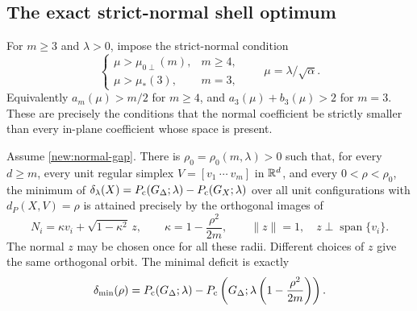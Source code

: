 \subsection{The exact strict-normal shell optimum}

For $m\ge3$ and $\lambda>0$, impose the strict-normal condition
\begin{equation}\label{new:normal-gap}
 \begin{cases}
  \mu>\mu_{0\perp}(m),&m\ge4,\\
  \mu>\mu_*(3),&m=3,
 \end{cases}
 \qquad \mu=\lambda/\sqrt\alpha.
\end{equation}
Equivalently $a_m(\mu)>m/2$ for $m\ge4$, and
$a_3(\mu)+b_3(\mu)>2$ for $m=3$. These are precisely the conditions that
the normal coefficient be strictly smaller than every in-plane coefficient
whose space is present.

\begin{theorem}\label{thm:normal-shell}
Assume \eqref{new:normal-gap}. There is $\rho_0=\rho_0(m,\lambda)>0$
such that, for every $d\ge m$, every unit regular simplex
$V=[v_1\ \cdots\ v_m]$ in $\mathbb R^d$, and every $0<\rho<\rho_0$, the minimum
of $\delta_\lambda(X)=P_{\mathrm c}(G_\Delta;\lambda)-P_{\mathrm c}(G_X;\lambda)$ over all
unit configurations with $d_P(X,V)=\rho$ is attained precisely by the
orthogonal images of
\begin{equation}\label{new:normal-minimizer}
 N_i=\kappa v_i+\sqrt{1-\kappa^2}\,z,\qquad
 \kappa=1-\frac{\rho^2}{2m},\qquad
 \|z\|=1,\quad z\perp\operatorname{span}\{v_i\}.
\end{equation}
The normal $z$ may be chosen once for all these radii. Different choices
of $z$ give the same orthogonal orbit. The minimal deficit is exactly
\begin{equation}\label{new:exact-deficit}
 \delta_{\min}(\rho)=
 P_{\mathrm c}(G_\Delta;\lambda)-
 P_{\mathrm c}\left(G_\Delta;\lambda\left(1-\frac{\rho^2}{2m}\right)\right).
\end{equation}
\end{theorem}

